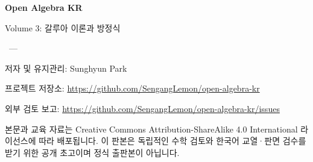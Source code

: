 \thispagestyle{empty}

\vspace*{\fill}

\begin{center}
\textbf{Open Algebra KR}\par
\medskip
Volume 3: 갈루아 이론과 방정식\par
\medskip
\BookVersion\ --- \BookRevision
\end{center}

\vspace{2em}

저자 및 유지관리: Sunghyun Park\par
프로젝트 저장소: \url{https://github.com/SengangLemon/open-algebra-kr}\par
외부 검토 보고: \url{https://github.com/SengangLemon/open-algebra-kr/issues}\par

\vspace{1em}

본문과 교육 자료는 Creative Commons Attribution-ShareAlike 4.0 International 라이선스에 따라 배포됩니다. 이 판본은 독립적인 수학 검토와 한국어 교열·판면 검수를 받기 위한 공개 초고이며 정식 출판본이 아닙니다.

\vspace*{\fill}
\clearpage
